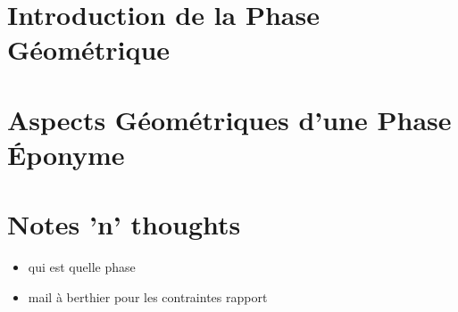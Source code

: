 \newpage








\part{Introduction de la Phase Géométrique} \label{part:param_instant} 




\part{Aspects Géométriques d'une Phase Éponyme} \label{part:phase_geo} 




\part{Notes 'n' thoughts} 
	
	


	



\newpage
\begin{itemize}
	\item qui est quelle phase
	\item mail à berthier pour les contraintes rapport
\end{itemize}
	
	
	

\newpage

\listoffigures
\vfill
\lstlistoflistings
\vfill

\newpage

{}


